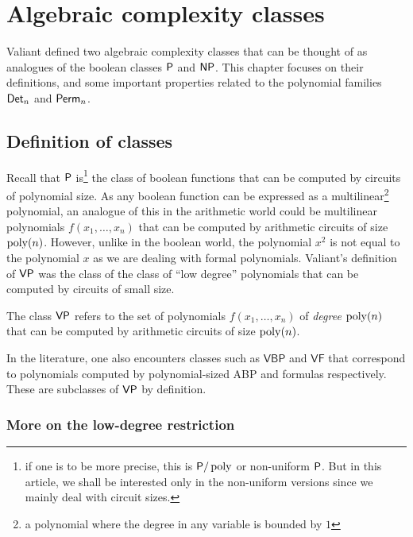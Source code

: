 \chapter{Algebraic complexity classes} \label{chap-vpvnp}

Valiant \cite{v79} defined two algebraic complexity classes that can be thought of as analogues of the boolean classes $\P$ and $\mathsf{NP}$. 
This chapter focuses on their definitions, and some important properties related to the polynomial families $\operatorname{\mathsf{Det}}_n$ and $\operatorname{\mathsf{Perm}}_n$. 

\section{Definition of classes}

Recall that $\P$ is\footnote{if one is to be more precise, this is $\mathsf{P}/\operatorname{poly}$ or non-uniform $\P$. 
But in this article, we shall be interested only in the non-uniform versions since we mainly deal with circuit sizes.} the class of boolean functions that can be computed by circuits of polynomial size. 
As any boolean function can be expressed as a multilinear\footnote{a polynomial where the degree in any variable is bounded by $1$} polynomial, an analogue of this in the arithmetic world could be multilinear polynomials $f(x_1,\dots, x_n)$ that can be computed by arithmetic circuits of size $\operatorname{poly}(n)$. 
However, unlike in the boolean world, the polynomial $x^2$ is not equal to the polynomial $x$ as we are dealing with formal polynomials. 
Valiant's definition of $\mathsf{VP}$ was the class of the class of ``low degree'' polynomials that can be computed by circuits of small size. 

\begin{definition}[Valiant's $\P$]\label{defn:vp}
The class $\mathsf{VP}$ refers to the set of polynomials $f(x_1,\dots, x_n)$ of \emph{degree $\operatorname{poly}(n)$} that can be computed by arithmetic circuits of size $\operatorname{poly}(n)$. 
\end{definition}

In the literature, one also encounters classes such as $\mathsf{VBP}$ and $\mathsf{VF}$ that correspond to polynomials computed by polynomial-sized ABP and formulas respectively. 
These are subclasses of $\mathsf{VP}$ by definition. 


\subsection*{More on the low-degree restriction}

